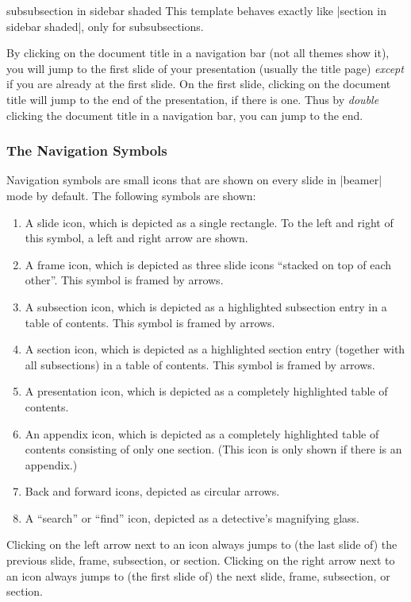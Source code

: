 \begin{element}{subsubsection in sidebar shaded}\yes\no\no
  This template behaves exactly like |section in sidebar shaded|, only for subsubsections.
\end{element}

By clicking on the document title in a navigation bar (not all themes show it), you will jump to the first slide of your presentation (usually the title page) \emph{except} if you are already at the first slide. On the first slide, clicking on the document title will jump to the end of the presentation, if there is one. Thus by \emph{double} clicking the document title in a navigation bar, you can jump to the end.

\subsubsection{The Navigation Symbols}
\label{section-navigation-symbols}

Navigation symbols are small icons that are shown on every slide in |beamer| mode by default. The following symbols are shown:
\begin{enumerate}
\item
  A slide icon, which is depicted as a single rectangle. To the left and right of this symbol, a left and right arrow are shown.
\item
  A frame icon, which is depicted as three slide icons ``stacked on top of each other''. This symbol is framed by arrows.
\item
  A subsection icon, which is depicted as a highlighted subsection entry in a table of contents. This symbol is framed by arrows.
\item
  A section icon, which is depicted as a highlighted section entry (together with all subsections) in a table of contents. This symbol is framed by arrows.
\item
  A presentation icon, which is depicted as a completely highlighted table of contents.
\item
  An appendix icon, which is depicted as a completely highlighted table of contents consisting of only one section. (This icon is only shown if there is an appendix.)
\item
  Back and forward icons, depicted as circular arrows.
\item
  A ``search'' or ``find'' icon, depicted as a detective's magnifying glass.
\end{enumerate}

Clicking on the left arrow next to an icon always jumps to (the last slide of) the previous slide, frame, subsection, or section. Clicking on the right arrow next to an icon always jumps to (the first slide of) the next slide, frame, subsection, or section.

